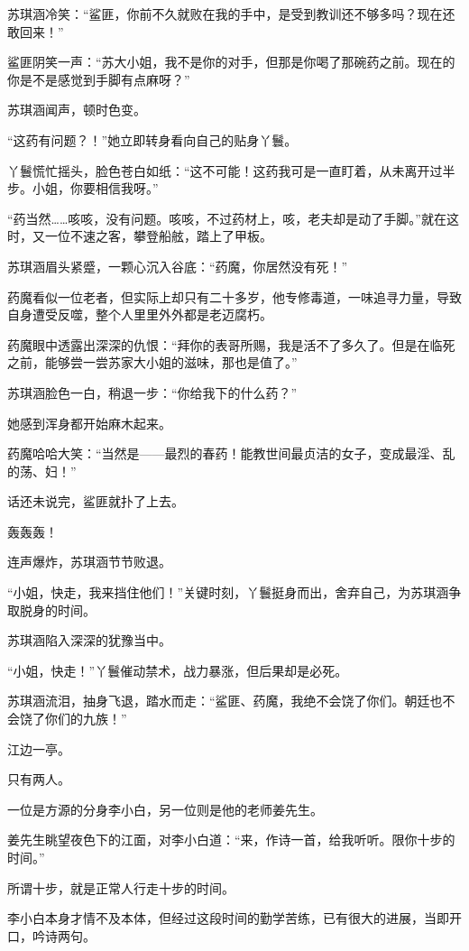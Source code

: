 \begin{this_body}
苏琪涵冷笑：“鲨匪，你前不久就败在我的手中，是受到教训还不够多吗？现在还敢回来！”

鲨匪阴笑一声：“苏大小姐，我不是你的对手，但那是你喝了那碗药之前。现在的你是不是感觉到手脚有点麻呀？”

苏琪涵闻声，顿时色变。

“这药有问题？！”她立即转身看向自己的贴身丫鬟。

丫鬟慌忙摇头，脸色苍白如纸：“这不可能！这药我可是一直盯着，从未离开过半步。小姐，你要相信我呀。”

“药当然……咳咳，没有问题。咳咳，不过药材上，咳，老夫却是动了手脚。”就在这时，又一位不速之客，攀登船舷，踏上了甲板。

苏琪涵眉头紧蹙，一颗心沉入谷底：“药魔，你居然没有死！”

药魔看似一位老者，但实际上却只有二十多岁，他专修毒道，一味追寻力量，导致自身遭受反噬，整个人里里外外都是老迈腐朽。

药魔眼中透露出深深的仇恨：“拜你的表哥所赐，我是活不了多久了。但是在临死之前，能够尝一尝苏家大小姐的滋味，那也是值了。”

苏琪涵脸色一白，稍退一步：“你给我下的什么药？”

她感到浑身都开始麻木起来。

药魔哈哈大笑：“当然是——最烈的春药！能教世间最贞洁的女子，变成最淫、乱的荡、妇！”

话还未说完，鲨匪就扑了上去。

轰轰轰！

连声爆炸，苏琪涵节节败退。

“小姐，快走，我来挡住他们！”关键时刻，丫鬟挺身而出，舍弃自己，为苏琪涵争取脱身的时间。

苏琪涵陷入深深的犹豫当中。

“小姐，快走！”丫鬟催动禁术，战力暴涨，但后果却是必死。

苏琪涵流泪，抽身飞退，踏水而走：“鲨匪、药魔，我绝不会饶了你们。朝廷也不会饶了你们的九族！”

江边一亭。

只有两人。

一位是方源的分身李小白，另一位则是他的老师姜先生。

姜先生眺望夜色下的江面，对李小白道：“来，作诗一首，给我听听。限你十步的时间。”

所谓十步，就是正常人行走十步的时间。

李小白本身才情不及本体，但经过这段时间的勤学苦练，已有很大的进展，当即开口，吟诗两句。


\end{this_body}
